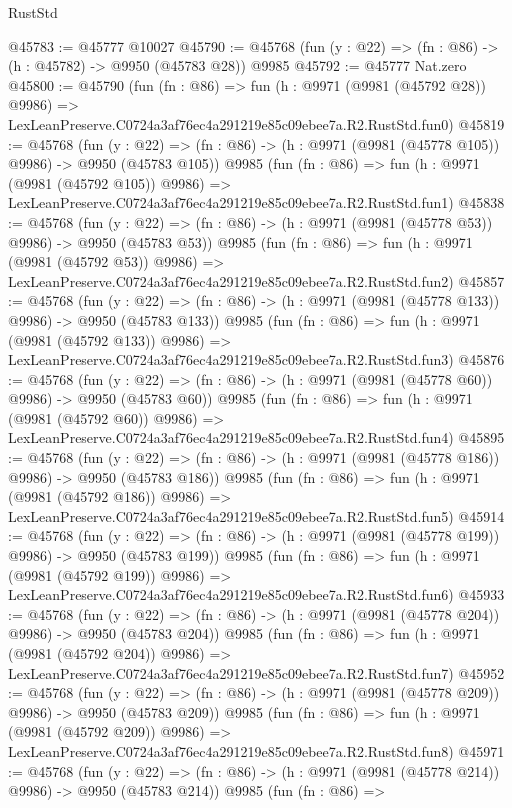 \begin{lexlean}{RustStd}
\begin{coremodule}
@45783 := @45777 @10027
@45790 := @45768 (fun (y : @22) => (fn : @86) -> (h : @45782) -> @9950 (@45783 @28)) @9985
@45792 := @45777 Nat.zero
@45800 := @45790
    (fun (fn : @86) =>
    fun (h : @9971 (@9981 (@45792 @28)) @9986) =>
    LexLeanPreserve.C0724a3af76ec4a291219e85c09ebee7a.R2.RustStd.fun0)
@45819 := @45768
    (fun (y : @22) => (fn : @86) -> (h : @9971 (@9981 (@45778 @105)) @9986) -> @9950 (@45783 @105))
    @9985
    (fun (fn : @86) =>
    fun (h : @9971 (@9981 (@45792 @105)) @9986) =>
    LexLeanPreserve.C0724a3af76ec4a291219e85c09ebee7a.R2.RustStd.fun1)
@45838 := @45768
    (fun (y : @22) => (fn : @86) -> (h : @9971 (@9981 (@45778 @53)) @9986) -> @9950 (@45783 @53))
    @9985
    (fun (fn : @86) =>
    fun (h : @9971 (@9981 (@45792 @53)) @9986) =>
    LexLeanPreserve.C0724a3af76ec4a291219e85c09ebee7a.R2.RustStd.fun2)
@45857 := @45768
    (fun (y : @22) => (fn : @86) -> (h : @9971 (@9981 (@45778 @133)) @9986) -> @9950 (@45783 @133))
    @9985
    (fun (fn : @86) =>
    fun (h : @9971 (@9981 (@45792 @133)) @9986) =>
    LexLeanPreserve.C0724a3af76ec4a291219e85c09ebee7a.R2.RustStd.fun3)
@45876 := @45768
    (fun (y : @22) => (fn : @86) -> (h : @9971 (@9981 (@45778 @60)) @9986) -> @9950 (@45783 @60))
    @9985
    (fun (fn : @86) =>
    fun (h : @9971 (@9981 (@45792 @60)) @9986) =>
    LexLeanPreserve.C0724a3af76ec4a291219e85c09ebee7a.R2.RustStd.fun4)
@45895 := @45768
    (fun (y : @22) => (fn : @86) -> (h : @9971 (@9981 (@45778 @186)) @9986) -> @9950 (@45783 @186))
    @9985
    (fun (fn : @86) =>
    fun (h : @9971 (@9981 (@45792 @186)) @9986) =>
    LexLeanPreserve.C0724a3af76ec4a291219e85c09ebee7a.R2.RustStd.fun5)
@45914 := @45768
    (fun (y : @22) => (fn : @86) -> (h : @9971 (@9981 (@45778 @199)) @9986) -> @9950 (@45783 @199))
    @9985
    (fun (fn : @86) =>
    fun (h : @9971 (@9981 (@45792 @199)) @9986) =>
    LexLeanPreserve.C0724a3af76ec4a291219e85c09ebee7a.R2.RustStd.fun6)
@45933 := @45768
    (fun (y : @22) => (fn : @86) -> (h : @9971 (@9981 (@45778 @204)) @9986) -> @9950 (@45783 @204))
    @9985
    (fun (fn : @86) =>
    fun (h : @9971 (@9981 (@45792 @204)) @9986) =>
    LexLeanPreserve.C0724a3af76ec4a291219e85c09ebee7a.R2.RustStd.fun7)
@45952 := @45768
    (fun (y : @22) => (fn : @86) -> (h : @9971 (@9981 (@45778 @209)) @9986) -> @9950 (@45783 @209))
    @9985
    (fun (fn : @86) =>
    fun (h : @9971 (@9981 (@45792 @209)) @9986) =>
    LexLeanPreserve.C0724a3af76ec4a291219e85c09ebee7a.R2.RustStd.fun8)
@45971 := @45768
    (fun (y : @22) => (fn : @86) -> (h : @9971 (@9981 (@45778 @214)) @9986) -> @9950 (@45783 @214))
    @9985
    (fun (fn : @86) =>

\end{coremodule}
\end{lexlean}
